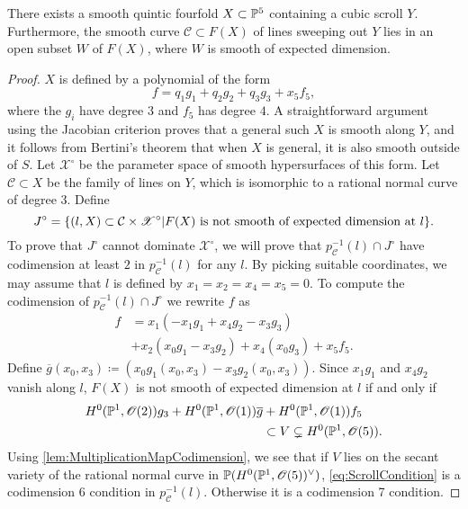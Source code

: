 \begin{proposition}
  \label{prop:QuinticDeg3Surface}
  There exists a smooth quintic fourfold $X \subset \P^5$ containing a cubic scroll $Y$. Furthermore, the smooth curve $\mathcal{C} \subset F(X)$ of lines sweeping out $Y$ lies in an open subset $W$ of $F(X)$, where $W$ is smooth of expected dimension.
\end{proposition}
\begin{proof}
$X$ is defined by a polynomial of the form
\begin{equation}
	\label{eq:CubicScroll1Hypersurface}
		f = q_1g_1 + q_2g_2 + q_3g_3 + x_5f_5,
\end{equation}
where the $g_i$ have degree $3$ and $f_5$ has degree $4$. A straightforward argument using the Jacobian criterion proves that a general such $X$ is smooth along $Y$, and it follows from Bertini's theorem that when $X$ is general, it is also smooth outside of $S$. Let $\mathscr{X}^\circ$ be the parameter space of smooth hypersurfaces of this form. Let ${\mathcal{C}} \subset X$ be the family of lines on $Y$, which is isomorphic to a rational normal curve of degree 3. Define
\[J^\circ = \set{(l,X) \subset {\mathcal{C}} \times \mathscr{X}^\circ \vert F(X)\text{ is not smooth of expected dimension at } l }.\]
To prove that $J^\circ$ cannot dominate $\mathscr{X}^\circ$, we will prove that $p_{\mathcal{C}}^{-1}(l) \cap J^\circ$ have codimension at least $2$ in $p_{\mathcal{C}}^{-1}(l)$ for any $l$. By picking suitable coordinates, we may assume that $l$ is defined by $x_1 = x_2 = x_4 = x_5 = 0$. To compute the codimension of $p_{\mathcal{C}}^{-1}(l) \cap J^\circ$ we rewrite $f$ as
\begin{equation}
	\label{eq:CubicScroll2}
	\begin{split}
		f &= x_1(-x_1g_1 + x_4g_2 - x_3g_3)\\
		  &+ x_2(x_0g_1 - x_3g_2) + x_4(x_0 g_3) + x_5f_5.
	\end{split}
\end{equation}
Define $\overline{g}(x_0,x_3) \coloneqq (x_0g_1(x_0,x_3) - x_3g_2(x_0,x_3))$. Since $x_1g_1$ and $x_4g_2$ vanish along $l$, $F(X)$ is not smooth of expected dimension at $l$ if and only if
\begin{align}
	\label{eq:ScrollCondition}
	H^0(\P^1,\sO(2))g_3 + H^0(\P^1,\sO(1))\overline{g} &+ H^0(\P^1,\sO(1))f_5 \nonumber \\ &\subset V \subsetneq H^0(\P^1,\sO(5)).
\end{align}
Using \cref{lem:MultiplicationMapCodimension}, we see that if $V$ lies on the secant variety of the rational normal curve in $\P(H^0(\P^1,\sO(5))^\vee)$, \eqref{eq:ScrollCondition} is a codimension $6$ condition in $p_{\mathcal{C}}^{-1}(l)$. Otherwise it is a codimension 7 condition.


\end{proof}
